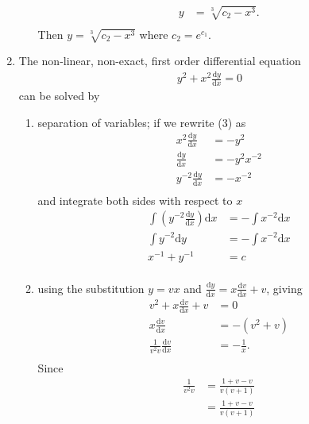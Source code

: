 \documentclass[10pt]{article}
\newcommand*{\dydx}[0]{\frac{\text{d}y}{\text{d}x}}
\newcommand*{\dy}[0]{\text{d}y}
\newcommand*{\dx}[0]{\text{d}x}
\newcommand*{\df}[2]{\frac{\text{d}{#1}}{\text{d}{#2}}}%
\begin{document}
\begin{enumerate}
\begin{enumerate}
\begin{align*}
                    y &= \sqrt[3]{c_2 - x^3}. \\
                \end{align*}
                Then $y = \sqrt[3]{c_2 - x^3}$ where $c_2 = e^{c_1}$.
        \end{enumerate}
        \item The non-linear, non-exact, first order differential equation
            \begin{align}
                y^2 + x^2\dydx = 0
            \end{align}
            can be solved by
            \begin{enumerate}
                \item separation of variables; if we rewrite (3) as
                    \begin{align*}
                        x^2\dydx &= -y^2 \\
                        \dydx &= -y^2x^{-2} \\
                        y^{-2}\dydx &= -x^{-2} \\
                    \end{align*}
                    and integrate both sides with respect to $x$
                    \begin{align*}
                        \int \left(y^{-2}\dydx\right)\dx &= -\int x^{-2} \dx \\
                        \int y^{-2}\dy &= -\int x^{-2} \dx \\
                         x^{-1} + y^{-1} &= c\\
                    \end{align*}
                \item using the substitution $y = vx$ and $\dydx = x\df{v}{x} +
                    v$, giving
                    \begin{align*}
                        v^2 + x\df{v}{x} + v &= 0 \\
                        x\df{v}{x} &= - (v^2+v) \\
                        \frac{1}{v^2 v}\df{v}{x} &= -\frac{1}{x}. \\
                    \end{align*}
                    Since
                    \begin{align*}
                        \frac{1}{v^2 v} &= \frac{1 + v - v}{v(v +1)} \\
                         &= \frac{1 + v - v}{v(v +1)} \\

\end{align*}
\end{enumerate}
\end{enumerate}
\end{document}
